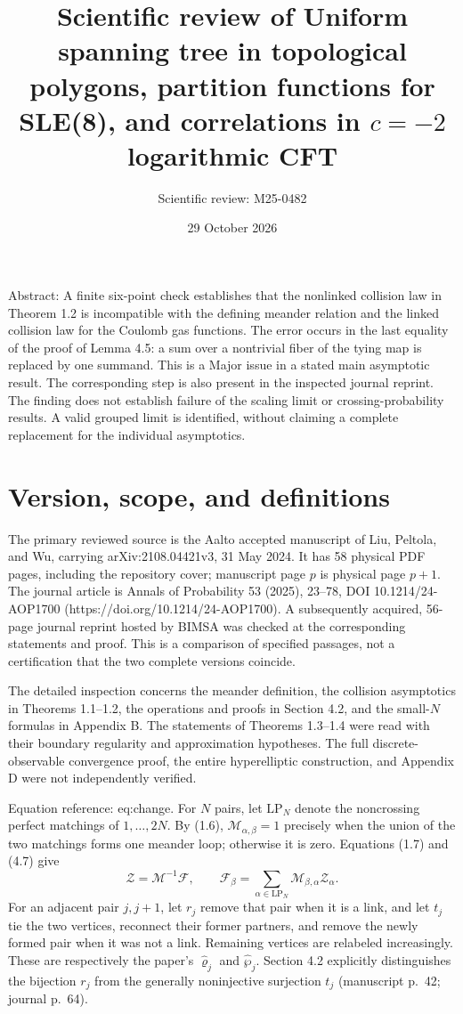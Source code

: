 \documentclass[10pt]{article}
\title{Scientific review of
Uniform spanning tree in topological polygons, partition functions for SLE(8), and correlations in \(c=-2\) logarithmic CFT}
\author{Scientific review: M25-0482}
\date{29 October 2026}
\begin{document}
\maketitle
Abstract: A finite six-point check establishes that the nonlinked collision law in Theorem 1.2 is incompatible with the defining meander relation and the linked collision law for the Coulomb gas functions. The error occurs in the last equality of the proof of Lemma 4.5: a sum over a nontrivial fiber of the tying map is replaced by one summand. This is a Major issue in a stated main asymptotic result. The corresponding step is also present in the inspected journal reprint. The finding does not establish failure of the scaling limit or crossing-probability results. A valid grouped limit is identified, without claiming a complete replacement for the individual asymptotics.\par
\section*{Version, scope, and definitions}
The primary reviewed source is the Aalto accepted manuscript of Liu, Peltola, and Wu, carrying arXiv:2108.04421v3, 31 May 2024. It has 58 physical PDF pages, including the repository cover; manuscript page \(p\) is physical page \(p+1\). The journal article is Annals of Probability 53 (2025), 23–78, DOI 10.1214/24-AOP1700 (https://doi.org/10.1214/24-AOP1700). A subsequently acquired, 56-page journal reprint hosted by BIMSA was checked at the corresponding statements and proof. This is a comparison of specified passages, not a certification that the two complete versions coincide.\par
The detailed inspection concerns the meander definition, the collision asymptotics in Theorems 1.1–1.2, the operations and proofs in Section 4.2, and the small-\(N\) formulas in Appendix B. The statements of Theorems 1.3–1.4 were read with their boundary regularity and approximation hypotheses. The full discrete-observable convergence proof, the entire hyperelliptic construction, and Appendix D were not independently verified.\par
Equation reference: eq:change. For \(N\) pairs, let \(\mathrm{LP}_N\) denote the noncrossing perfect matchings of \(1,\ldots,2N\). By (1.6), \(\mathcal M_{\alpha,\beta}=1\) precisely when the union of the two matchings forms one meander loop; otherwise it is zero. Equations (1.7) and (4.7) give \[
 \mathcal Z=\mathcal M^{-1}\mathcal F,\qquad \mathcal F_\beta=\sum_{\alpha\in\mathrm{LP}_N}
 \mathcal M_{\beta,\alpha}\mathcal Z_\alpha .\] For an adjacent pair \(j,j+1\), let \(r_j\) remove that pair when it is a link, and let \(t_j\) tie the two vertices, reconnect their former partners, and remove the newly formed pair when it was not a link. Remaining vertices are relabeled increasingly. These are respectively the paper’s \(\widehat\varrho_j\) and \(\widehat\wp_j\). Section 4.2 explicitly distinguishes the bijection \(r_j\) from the generally noninjective surjection \(t_j\) (manuscript p. 42; journal p. 64).\par
\end{document}
